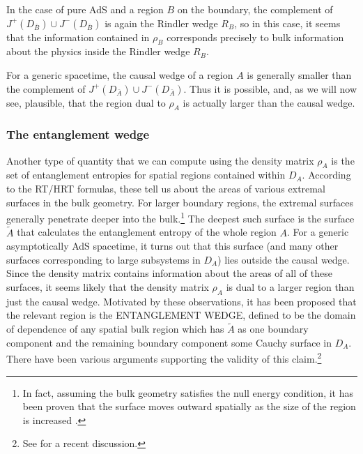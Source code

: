 \documentclass[12pt,epsf]{article}
\begin{document}
In the case of pure AdS and a region $B$ on the boundary, the complement of $J^+(D_{\bar{B}}) \cup J^-(D_{\bar{B}})$ is again the Rindler wedge $R_B$, so in this case, it seems that the information contained in $\rho_B$ corresponds precisely to bulk information about the physics inside the Rindler wedge $R_B$.

For a generic spacetime, the causal wedge of a region $A$ is generally smaller than the complement of $J^+(D_{\bar{A}}) \cup J^-(D_{\bar{A}})$. Thus it is possible, and, as we will now see, plausible, that the region dual to $\rho_A$ is actually larger than the causal wedge.

\subsubsection*{The entanglement wedge}

Another type of quantity that we can compute using the density matrix $\rho_A$ is the set of entanglement entropies for spatial regions contained within $D_A$. According to the RT/HRT formulas, these tell us about the areas of various extremal surfaces in the bulk geometry. For larger boundary regions, the extremal surfaces generally penetrate deeper into the bulk.\footnote{In fact, assuming the bulk geometry satisfies the null energy condition, it has been proven that the surface moves outward spatially as the size of the region is increased \cite{Wall:2012uf}.} The deepest such surface is the surface $\tilde{A}$ that calculates the entanglement entropy of the whole region $A$. For a generic asymptotically AdS spacetime, it turns out that this surface (and many other surfaces corresponding to large subsystems in $D_A$) lies outside the causal wedge. Since the density matrix contains information about the areas of all of these surfaces, it seems likely that the density matrix $\rho_A$ is dual to a larger region than just the causal wedge. Motivated by these observations, it has been proposed \cite{Czech:2012bh,Wall:2012uf,Entwedge} that the relevant region is the ENTANGLEMENT WEDGE, defined to be the domain of dependence of any spatial bulk region which has $\tilde{A}$ as one boundary component and the remaining boundary component some Cauchy surface in $D_A$. There have been various arguments supporting the validity of this claim.\footnote{See \cite{Dong:2016eik} for a recent discussion.}
\end{document}
